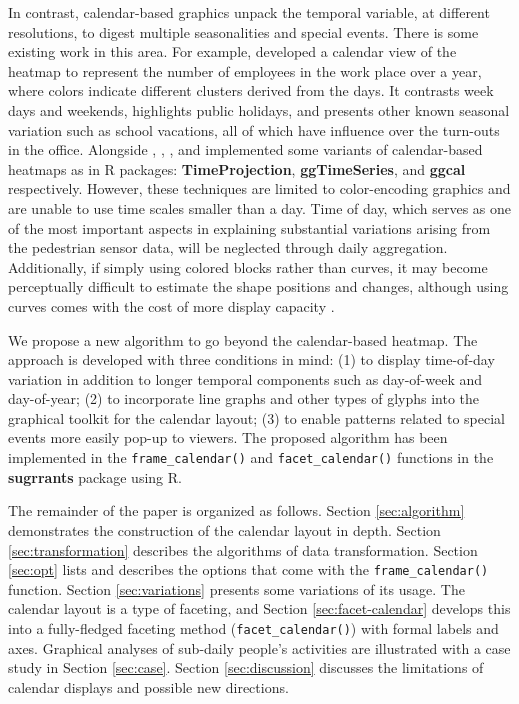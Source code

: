 \documentclass[12pt]{article}
\begin{document}
In contrast, calendar-based graphics unpack the temporal variable, at different resolutions, to digest multiple seasonalities and special events. There is some existing work in this area. For example, \citet{VanWijkCluster1999} developed a calendar view of the heatmap to represent the number of employees in the work place over a year, where colors indicate different clusters derived from the days. It contrasts week days and weekends, highlights public holidays, and presents other known seasonal variation such as school vacations, all of which have influence over the turn-outs in the office. Alongside \citet{Jones-heatmap}, \citet{R-TimeProjection}, \citet{R-ggTimeSeries}, and \citet{R-ggcal} implemented some variants of calendar-based heatmaps as in R packages: \textbf{TimeProjection}, \textbf{ggTimeSeries}, and \textbf{ggcal} respectively. However, these techniques are limited to color-encoding graphics and are unable to use time scales smaller than a day. Time of day, which serves as one of the most important aspects in explaining substantial variations arising from the pedestrian sensor data, will be neglected through daily aggregation. Additionally, if simply using colored blocks rather than curves, it may become perceptually difficult to estimate the shape positions and changes, although using curves comes with the cost of more display capacity \citep{cleveland1984graphical, lam2007overview}.

We propose a new algorithm to go beyond the calendar-based heatmap. The approach is developed with three conditions in mind: (1) to display time-of-day variation in addition to longer temporal components such as day-of-week and day-of-year; (2) to incorporate line graphs and other types of glyphs into the graphical toolkit for the calendar layout; (3) to enable patterns related to special events more easily pop-up to viewers. The proposed algorithm has been implemented in the \texttt{frame\_calendar()} and \texttt{facet\_calendar()} functions in the \textbf{sugrrants} package using R.

The remainder of the paper is organized as follows. Section \ref{sec:algorithm} demonstrates the construction of the calendar layout in depth. Section \ref{sec:transformation} describes the algorithms of data transformation. Section \ref{sec:opt} lists and describes the options that come with the \texttt{frame\_calendar()} function. Section \ref{sec:variations} presents some variations of its usage. The calendar layout is a type of faceting, and Section \ref{sec:facet-calendar} develops this into a fully-fledged faceting method (\texttt{facet\_calendar()}) with formal labels and axes. Graphical analyses of sub-daily people's activities are illustrated with a case study in Section \ref{sec:case}. Section \ref{sec:discussion} discusses the limitations of calendar displays and possible new directions.
\end{document}
